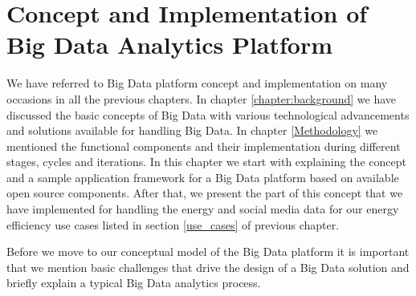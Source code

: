 \chapter[Big Data Analytics Platform]{Concept and Implementation of Big Data Analytics Platform}
\label{chapter:platform}
We have referred to Big Data platform concept and implementation on many occasions in all the previous chapters. In chapter \ref{chapter:background} we have discussed the basic concepts of Big Data with various technological advancements and solutions available for handling Big Data. In chapter \ref{Methodology} we mentioned the functional components and their implementation during different stages, cycles and iterations. In this chapter we start with explaining the concept and a sample application framework for a Big Data platform based on available open source components. After that, we present the part of this concept that we have implemented for handling the energy and social media data for our energy efficiency use cases listed in section \ref{use_cases} of previous chapter. 

Before we move to our conceptual model of the Big Data platform it is important that we mention basic challenges that drive the design of a Big Data solution and briefly explain a typical Big Data analytics process.

